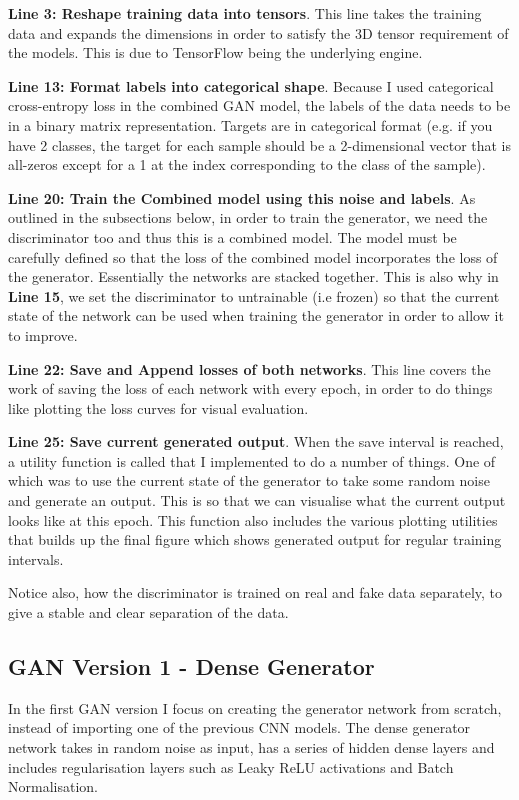 \documentclass[12pt,a4paper,twoside]{report}
\begin{document}
\textbf{Line 3: Reshape training data into tensors}. This line takes the training data and expands the dimensions in order to satisfy the 3D tensor requirement of the models. This is due to TensorFlow being the underlying engine. 

\textbf{Line 13: Format labels into categorical shape}. Because I used categorical cross-entropy loss in the combined GAN model, the labels of the data needs to be in a binary matrix representation. Targets are in categorical format (e.g. if you have 2 classes, the target for each sample should be a 2-dimensional vector that is all-zeros except for a 1 at the index corresponding to the class of the sample).

\textbf{Line 20: Train the Combined model using this noise and labels}. As outlined in the subsections below, in order to train the generator, we need the discriminator too and thus this is a combined model. The model must be carefully defined so that the loss of the combined model incorporates the loss of the generator. Essentially the networks are stacked together. This is also why in \textbf{Line 15}, we set the discriminator to untrainable (i.e frozen) so that the current state of the network can be used when training the generator in order to allow it to improve. 

\textbf{Line 22: Save and Append losses of both networks}. This line covers the work of saving the loss of each network with every epoch, in order to do things like plotting the loss curves for visual evaluation.

\textbf{Line 25: Save current generated output}. When the save interval is reached, a utility function is called that I implemented to do a number of things. One of which was to use the current state of the generator to take some random noise and generate an output. This is so that we can visualise what the current output looks like at this epoch. This function also includes the various plotting utilities that builds up the final figure which shows generated output for regular training intervals. 

Notice also, how the discriminator is trained on real and fake data separately, to give a stable and clear separation of the data.

\subsection{GAN Version 1 - Dense Generator}

In the first GAN version I focus on creating the generator network from scratch, instead of importing one of the previous CNN models. The dense generator network takes in random noise as input, has a series of hidden dense layers and includes regularisation layers such as Leaky ReLU activations and Batch Normalisation.
\end{document}
